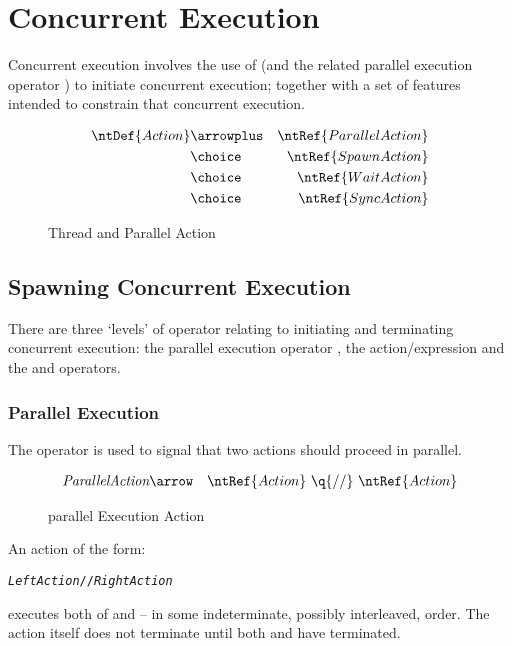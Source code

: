 \chapter{Concurrent Execution}
\label{threads}

Concurrent execution involves the use of  (and the related parallel execution operator \q{//}) to initiate concurrent execution; together with a set of features intended to constrain that concurrent execution.

\begin{figure}[htbp]
\begin{eqnarray*}
\ntDef{Action}&\arrowplus&\ntRef{ParallelAction}\\
&\choice&\ntRef{SpawnAction}\\
&\choice&\ntRef{WaitAction}\\
&\choice&\ntRef{SyncAction}%
\end{eqnarray*}
\caption{Thread and Parallel Action}
\label{threadActionFig}
\end{figure}

\section{Spawning Concurrent Execution}
\label{threadSpawning}

There are three `levels' of operator relating to initiating and terminating concurrent execution: the parallel execution operator \q{//}, the  action/expression and the  and  operators.

\subsection{Parallel Execution}
\label{parallelExecution}

The \q{//} operator is used to signal that two actions should proceed in parallel.
\begin{figure}[htbp]
\begin{eqnarray*}
\emph{ParallelAction}&\arrow&\ntRef{Action}\ \q{//}\ \ntRef{Action}
\end{eqnarray*}
\caption{parallel Execution Action}
\label{parallelExecutionFig}
\end{figure}

An action of the form:
\begin{alltt}
\emph{LeftAction}//\emph{RightAction}
\end{alltt}
executes both of  and  -- in some indeterminate, possibly interleaved, order. The action itself does not terminate until both  and  have terminated.

